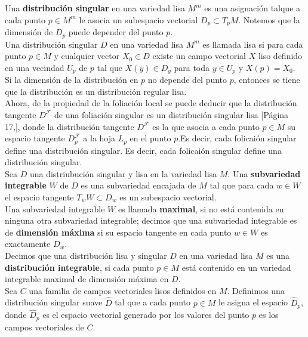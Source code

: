 \documentclass[a4paper,10pt]{book}
\begin{document}
Una {\bfseries distribuci\'on singular} en una variedad lisa $M^{m}$ es una asignaci\'on talque a cada punto $p\in M^{m}$ le asocia un subespacio vectorial $D_{p}\subset T_{p}M$. Notemos que la dimensi\'on de $D_{p}$ puede depender del punto $p$. \\

Una distribuci\'on singular $D$ en una variedad lisa $M^{m}$ es llamada lisa si para cada punto $p\in M$ y cualquier vector $X_{0}\in D$ existe un campo vectorial $X$ liso definido en una vecindad  $U_{p}$ de $p$ tal que $X(y)\in D_{y}$ para toda $y\in U_{p}$ y $X(p)=X_{0}$.\\

Si la dimensi\'on de la distribuci\'on en $p$ no depende del punto $p$, entonces se tiene que la distribuci\'on es un distribuci\'on regular lisa.\\

Ahora, de la propiedad de la foliaci\'on local se puede deducir que la distribuci\'on tangente $D^{\mathcal{F}}$ de una foliaci\'on singular es un distribuci\'on singular lisa [P\'agina 17,\cite{Dufour}], donde la distribuci\'on tangente $D^{\mathcal{F}}$ es la que asocia a cada punto $p\in M$ su espacio tangente $D_{p}^{\mathcal{F}}$ a la hoja $L_{p}$ en el punto $p$.Es decir, cada folicai\'on singular define una distribuci\'on singular. Es decir, cada folicai\'on singular define una distribuci\'on singular.\\

Sea $D$ una distriubuci\'on singular y lisa en la variedad lisa $M$. Una {\bfseries subvariedad integrable} $W$ de $D$ es una subvariedad encajada de $M$ tal que para cada $w\in W$ el espacio tangente $T_{w}W\subset D_{w}$ es un subespacio vectorial.\\

Una subvariedad integrable $W$ es llamada {\bfseries maximal}, si no est\'a contenida en ninguna otra subvariedad integrable; decimos que una subvariedad integrable es de {\bfseries dimensi\'on m\'axima} si su espacio tangente en cada punto $w\in W$ es exactamente $D_{w}$.\\

Decimos que una distribuci\'on lisa y singular $D$ en una variedad lisa $M$ es una {\bfseries distribuci\'on integrable}, si cada punto $p\in M$ est\'a contenido en un variedad integrable maximal de dimensi\'on m\'axima en $D$. \\

Sea $C$ una familia de campos vectoriales lisos definidos en $M$. Definimos una distribuci\'on singular suave $\hat{D}$ tal que a cada punto $p\in M$ le asigna el espacio $\hat{D}_{p}$, donde $\hat{D}_{p}$ es el espacio vectorial generado por los valores del punto $p$ es los campos vectoriales de $C$.  
\vspace{5mm}
\end{document}
